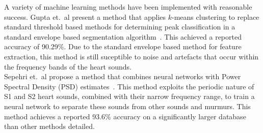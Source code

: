 \documentclass[titlepage, 12pt]{scrartcl} \usepackage{enumitem}
\begin{document}
A variety of machine learning methods have been implemented with reasonable
success. Gupta et.\ al present a method that applies $k$-means clustering to
replace standard threshold based methods for determining peak classification in
a standard envelope based segmentation algorithm~\citeyearpar{Gupta2007}. This achieved a reported
accuracy of 90.29\%. Due to the standard envelope based method for feature
extraction, this method is still suceptible to noise and artefacts that occur
within the frequency bands of the heart sounds.\\

Sepehri et.\ al propose a method that combines neural networks with Power
Spectral Density (PSD) estimates~\citeyearpar{Sepehri2010}. This method
exploits the periodic nature of S1 and S2 heart sounds, combined with their
narrow frequency range, to train a neural network to separate these sounds from
other sounds and murmurs. This method achieves a reported 93.6\% accuracy on a
significantly larger database than other methods detailed.\\
\end{document}
